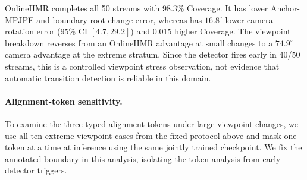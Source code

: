 OnlineHMR completes all 50 streams with 98.3\% Coverage. It has lower
Anchor-MPJPE and boundary root-change error, whereas \method{} has
$16.8^\circ$ lower camera-rotation error (95\% CI $[4.7,29.2]$) and 0.015
higher Coverage. The viewpoint breakdown reverses from an OnlineHMR advantage
at small changes to a $74.9^\circ$ \method{} camera advantage at the extreme
stratum. Since the detector fires early in 40/50 streams, this is a controlled
viewpoint stress observation, not evidence that automatic transition detection
is reliable in this domain.

\begin{table}[t]
  \centering
  \caption{Viewpoint-stratified Shot3R--OnlineHMR comparison on MVHuman.
  Anchor error is in mm and camera rotation in degrees. Camera gain is
  OnlineHMR minus Shot3R; intervals bootstrap the ten capture clusters.}
  \label{tab:mvhuman-onlinehmr-viewpoint}
  \scriptsize
  \resizebox{\textwidth}{!}{}
\end{table}

\paragraph{Alignment-token sensitivity.}
To examine the three typed alignment tokens under large viewpoint changes, we
use all ten extreme-viewpoint cases from the fixed protocol above and mask
one token at a time at inference using the same jointly trained
checkpoint. We fix the annotated boundary in this analysis, isolating the
token analysis from early detector triggers.

